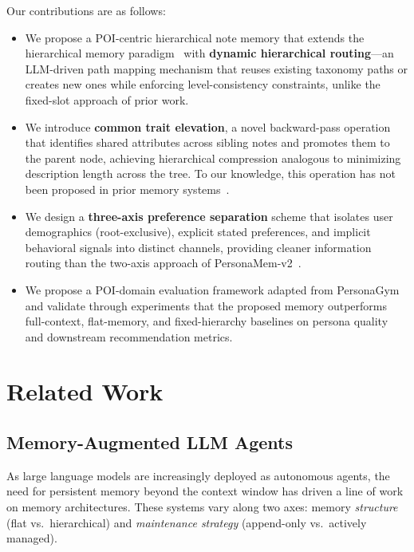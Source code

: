 \documentclass[manuscript,screen,review]{acmart}
\begin{document}
Our contributions are as follows:
\begin{itemize}
    \item We propose a POI-centric hierarchical note memory that extends the hierarchical memory paradigm~\cite{personamem-v2} with \textbf{dynamic hierarchical routing}---an LLM-driven path mapping mechanism that reuses existing taxonomy paths or creates new ones while enforcing level-consistency constraints, unlike the fixed-slot approach of prior work.
    \item We introduce \textbf{common trait elevation}, a novel backward-pass operation that identifies shared attributes across sibling notes and promotes them to the parent node, achieving hierarchical compression analogous to minimizing description length across the tree. To our knowledge, this operation has not been proposed in prior memory systems~\cite{mem0,amem,personamem-v2}.
    \item We design a \textbf{three-axis preference separation} scheme that isolates user demographics (root-exclusive), explicit stated preferences, and implicit behavioral signals into distinct channels, providing cleaner information routing than the two-axis approach of PersonaMem-v2~\cite{personamem-v2}.
    \item We propose a POI-domain evaluation framework adapted from PersonaGym~\cite{personagym} and validate through experiments that the proposed memory outperforms full-context, flat-memory, and fixed-hierarchy baselines on persona quality and downstream recommendation metrics.
\end{itemize}


\section{Related Work}

\subsection{Memory-Augmented LLM Agents}

As large language models are increasingly deployed as autonomous agents, the need for persistent memory beyond the context window has driven a line of work on memory architectures. These systems vary along two axes: memory \textit{structure} (flat vs.\ hierarchical) and \textit{maintenance strategy} (append-only vs.\ actively managed).
\end{document}
